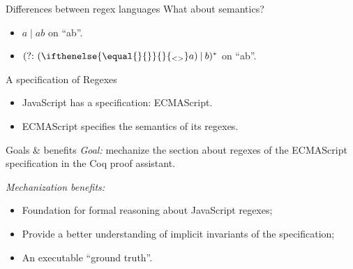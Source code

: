 \documentclass[aspectratio=169]{beamer}
\newcommand{\disj}[0]{\mathbin{|}}
\renewcommand{\star}[0]{^{*}}
\newcommand{\pgroup}[1]{({?}{:}\ #1)}
\newcommand{\group}[2][]{(\ifthenelse{\equal{#1}{}}{}{_{\textup{\scriptsize<#1>}}}#2)}
\newcommand{\overgroup}[4][]{\draw [decorate,decoration={brace,amplitude=1},thick,#1] (char#2.north west) --node[above]{#4} (char#3.north east);}
\newenvironment{match}[2]{%
\begin{tikzpicture}[baseline=0pt]%
    \foreach \n [count=\i from 0] in {``,#1,''} {%
        \node [anchor=base, text height=2ex, text depth=0.5ex, inner sep=1.5pt] (char\i) at (\i*1 em,0) {\n};  %
    }%
    \draw [very thick] ([yshift=0.5ex]char1.south west) -| (char#2.east);%
}{\end{tikzpicture}}
\newcommand{\simplematch}[2]{\begin{match}{#1}{#2}\end{match}}
\begin{document}
    \begin{frame}{Differences between regex languages}
        What about semantics?
        \pause{}
        \begin{itemize}
            \item $a \disj{} ab$ on ``ab''.
            \pause{}
            \vspace{3em}\pause{}
            \item $\pgroup{\group{a} \disj{} b}\star{}$ on ``ab''.
            \pause{}
        \end{itemize}
    \end{frame}

    \begin{frame}{A specification of Regexes}
        \begin{itemize}
            \item JavaScript has a specification: ECMAScript.
            \pause{}
            \item ECMAScript specifies the semantics of its regexes.
        \end{itemize}
    \end{frame}

    \begin{frame}{Goals \& benefits}
        \emph{Goal:} mechanize the section about regexes of the ECMAScript specification in the Coq proof assistant.

        \pause{}
        \emph{Mechanization benefits:}
        \begin{itemize}
            \item Foundation for formal reasoning about JavaScript regexes;
            \pause{}
            \item Provide a better understanding of implicit invariants of the specification;
            \pause{}
            \item An executable ``ground truth''.
        \end{itemize}
    \end{frame}
\end{document}
